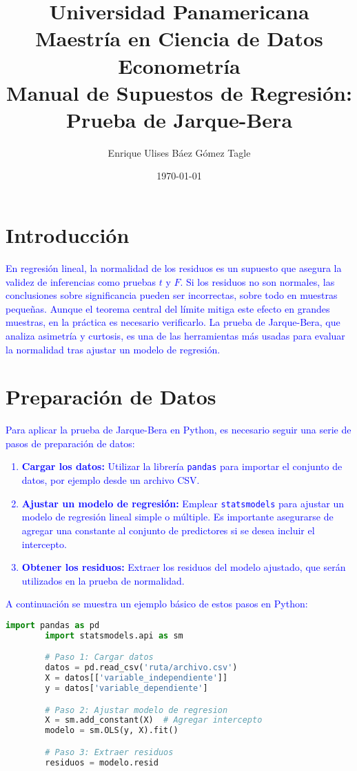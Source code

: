 \documentclass[10pt]{article}
\title{Universidad Panamericana \\ Maestría en Ciencia de Datos \\ Econometría \\
    \vspace{0.5cm} Manual de Supuestos de Regresión:\\
    Prueba de Jarque-Bera}
\author{Enrique Ulises Báez Gómez Tagle}
\date{\today}
\begin{document}
\maketitle

\tableofcontents

\newpage
\section{Introducción}
    \textcolor{blue}{
        En regresión lineal, la normalidad de los residuos es un supuesto que asegura la validez de inferencias como 
        pruebas $t$ y $F$. Si los residuos no son normales, las conclusiones sobre significancia pueden ser incorrectas, 
        sobre todo en muestras pequeñas. Aunque el teorema central del límite mitiga este efecto en grandes muestras, 
        en la práctica es necesario verificarlo. La prueba de Jarque-Bera, que analiza asimetría y curtosis, es una de 
        las herramientas más usadas para evaluar la normalidad tras ajustar un modelo de regresión.
    }
\section{Preparación de Datos}
    \textcolor{blue}{
        Para aplicar la prueba de Jarque-Bera en Python, es necesario seguir una serie de pasos de preparación de datos:
        \begin{enumerate}
            \item \textbf{Cargar los datos:} Utilizar la librería \texttt{pandas} para importar el conjunto de datos, por ejemplo desde un archivo CSV.
            \item \textbf{Ajustar un modelo de regresión:} Emplear \texttt{statsmodels} para ajustar un modelo de regresión lineal simple o múltiple. Es importante asegurarse de agregar una constante al conjunto de predictores si se desea incluir el intercepto.
            \item \textbf{Obtener los residuos:} Extraer los residuos del modelo ajustado, que serán utilizados en la prueba de normalidad.
        \end{enumerate}
    }
    \textcolor{blue}{
        A continuación se muestra un ejemplo básico de estos pasos en Python:
    }
    \begin{lstlisting}[language=Python]
        import pandas as pd
        import statsmodels.api as sm

        # Paso 1: Cargar datos
        datos = pd.read_csv('ruta/archivo.csv')
        X = datos[['variable_independiente']]
        y = datos['variable_dependiente']

        # Paso 2: Ajustar modelo de regresion
        X = sm.add_constant(X)  # Agregar intercepto
        modelo = sm.OLS(y, X).fit()

        # Paso 3: Extraer residuos
        residuos = modelo.resid
    \end{lstlisting}
\end{document}
